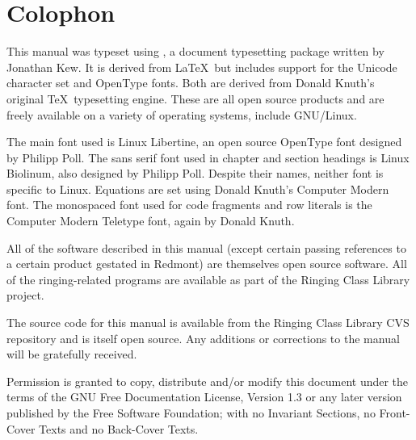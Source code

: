 \documentclass[a4paper,11pt,oneside]{book}
\begin{document}
\clearpage
\footnotesize
{}

\normalsize
\chapter*{Colophon}

This manual was typeset using \XeTeX{}, a document 
typesetting package written by Jonathan Kew.  It is derived from 
\LaTeX\ but includes support for the Unicode character set and OpenType fonts.
Both are derived from Donald Knuth's original \TeX\ typesetting engine.  
These are all open source products and are freely available on a variety of 
operating systems, include GNU/Linux. 

The main font used is Linux Libertine, an open source OpenType font designed
by Philipp Poll.  The sans serif font used in chapter and section headings
is Linux Biolinum, also designed by Philipp Poll.  Despite their names,
neither font is specific to Linux.  Equations are set using Donald Knuth's 
Computer Modern font.  The monospaced font used for code fragments and
row literals is the Computer Modern Teletype font, again by Donald Knuth.%

All of the software described in this manual (except certain passing
references to a certain product gestated in Redmont) are themselves open
source software.  All of the ringing-related programs are available as 
part of the Ringing Class Library project.

The source code for this manual is available from the Ringing Class Library
CVS repository and is itself open source.  Any additions or corrections 
to the manual will be gratefully received.

\vfil
\footnotesize
Permission is granted to copy, distribute and/or modify this
document under the terms of the GNU Free Documentation License,
Version 1.3 or any later version published by the Free Software
Foundation; with no Invariant Sections, no Front-Cover Texts and
no Back-Cover Texts.
\end{document}
